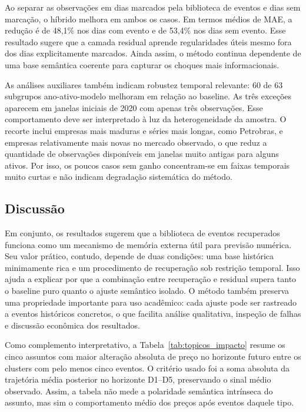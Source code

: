 \documentclass[12pt]{article}
\begin{document}
Ao separar as observações em dias marcados pela biblioteca de eventos e dias sem marcação, o híbrido melhora em ambos os casos. Em termos médios de MAE, a redução é de 48,1\% nos dias com evento e de 53,4\% nos dias sem evento. Esse resultado sugere que a camada residual aprende regularidades úteis mesmo fora dos dias explicitamente marcados. Ainda assim, o método continua dependente de uma base semântica coerente para capturar os choques mais informacionais.

As análises auxiliares também indicam robustez temporal relevante: 60 de 63 subgrupos ano-ativo-modelo melhoram em relação ao baseline. As três exceções aparecem em janelas iniciais de 2020 com apenas três observações. Esse comportamento deve ser interpretado à luz da heterogeneidade da amostra. O recorte inclui empresas mais maduras e séries mais longas, como Petrobras, e empresas relativamente mais novas no mercado observado, o que reduz a quantidade de observações disponíveis em janelas muito antigas para alguns ativos. Por isso, os poucos casos sem ganho concentram-se em faixas temporais muito curtas e não indicam degradação sistemática do método.

\subsection{Discussão}

Em conjunto, os resultados sugerem que a biblioteca de eventos recuperados funciona como um mecanismo de memória externa útil para previsão numérica. Seu valor prático, contudo, depende de duas condições: uma base histórica minimamente rica e um procedimento de recuperação sob restrição temporal. Isso ajuda a explicar por que a combinação entre recuperação e residual supera tanto o baseline puro quanto o ajuste semântico isolado. O método também preserva uma propriedade importante para uso acadêmico: cada ajuste pode ser rastreado a eventos históricos concretos, o que facilita análise qualitativa, inspeção de falhas e discussão econômica dos resultados.

Como complemento interpretativo, a Tabela~\ref{tab:topicos_impacto} resume os cinco assuntos com maior alteração absoluta de preço no horizonte futuro entre os clusters com pelo menos cinco eventos. O critério usado foi a soma absoluta da trajetória média posterior no horizonte D1--D5, preservando o sinal médio observado. Assim, a tabela não mede a polaridade semântica intrínseca do assunto, mas sim o comportamento médio dos preços após eventos daquele tipo.
\end{document}
